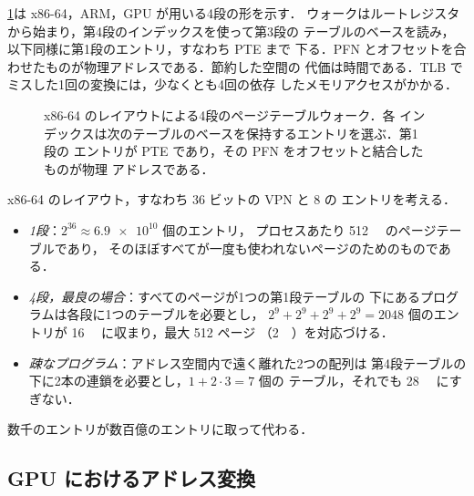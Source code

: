 \documentclass[../main.tex]{subfiles}
\begin{document}
\cref{fig:l07-page-walk}は x86-64，ARM，GPU が用いる4段の形を示す．
ウォークはルートレジスタから始まり，第4段のインデックスを使って第3段の
テーブルのベースを読み，以下同様に第1段のエントリ，すなわち PTE まで
下る．PFN とオフセットを合わせたものが物理アドレスである．節約した空間の
代価は時間である．TLB でミスした1回の変換には，少なくとも4回の依存
したメモリアクセスがかかる．

\begin{figure}[tb]
  \centering
  
  \caption{x86-64 のレイアウトによる4段のページテーブルウォーク．各
    インデックスは次のテーブルのベースを保持するエントリを選ぶ．第1段の
    エントリが PTE であり，その PFN をオフセットと結合したものが物理
    アドレスである．}
  \label{fig:l07-page-walk}
\end{figure}

\begin{example}
  \label{ex:l07-table-size}
  x86-64 のレイアウト，すなわち 36 ビットの VPN と \SI{8}{\byte} の
  エントリを考える．
  \begin{itemize}
    \item \emph{1段}：$2^{36} \approx \num{6.9e10}$ 個のエントリ，
      プロセスあたり \SI{512}{\gibi\byte} のページテーブルであり，
      そのほぼすべてが一度も使われないページのためのものである．
    \item \emph{4段，最良の場合}：すべてのページが1つの第1段テーブルの
      下にあるプログラムは各段に1つのテーブルを必要とし，
      $2^9+2^9+2^9+2^9 = \num{2048}$ 個のエントリが
      \SI{16}{\kibi\byte} に収まり，最大 512 ページ
      （\SI{2}{\mebi\byte}）を対応づける．
    \item \emph{疎なプログラム}：アドレス空間内で遠く離れた2つの配列は
      第4段テーブルの下に2本の連鎖を必要とし，$1+2\cdot3 = 7$ 個の
      テーブル，それでも \SI{28}{\kibi\byte} にすぎない．
  \end{itemize}
  数千のエントリが数百億のエントリに取って代わる．
\end{example}

\subsection{GPU におけるアドレス変換}
\end{document}
